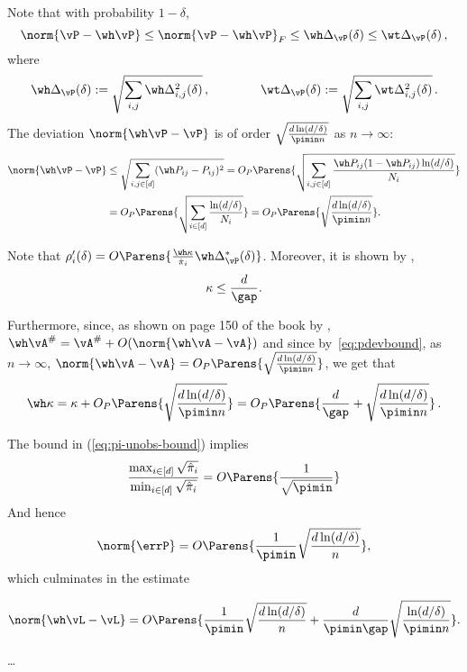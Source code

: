 Note that with probability $1-\delta$, 
\[
\norm{\vP - \wh\vP} \le \norm{\vP-\wh\vP}_F \le \wh\Delta_{\vP}(\delta) \le \wt\Delta_{\vP}(\delta)\,,
\]
where
\[
\wh\Delta_{\vP}(\delta) := \sqrt{\sum_{i,j} \wh\Delta_{i,j}^2(\delta)}\,, \qquad \qquad 
\wt\Delta_{\vP}(\delta) := \sqrt{\sum_{i,j} \wt\Delta_{i,j}^2(\delta)}\,.
\]
The deviation $\norm{\wh\vP - \vP}$ is of order $\sqrt{\frac{d \ln(d/\delta)}{\pimin n}}$ as $n\to \infty$:
\begin{align}
  \norm{\wh\vP - \vP} &\le
  \sqrt{\sum_{i,j\in[d]} (\wh P_{ij}-P_{ij})^2} 
  =
  O_P\Parens{
\sqrt{\sum_{i,j\in[d]} \frac{ \wh P_{ij}(1-\wh P_{ij})\ln(d/\delta)}{N_i}}
  } \nonumber\\
  &=
  O_P\Parens{
\sqrt{\sum_{i\in[d]} \frac{\ln(d/\delta)}{N_i}}
  } 
=O_P\Parens{\sqrt{\frac{d\ln(d/\delta)}{\pimin n}}}.  \label{eq:pdevbound}
\end{align}  


Note that
$  \rho_i'(\delta) = O\Parens{\frac{\wh\kappa}{\hat\pi_i}  \wh\Delta_{\vP}^*(\delta)}$.
Moreover, it is shown  by \citet{cho2001comparison},
\[
  \kappa \leq \frac{d}{\gap} .
  \]

  Furthermore, since, as shown  on page 150 of the book by \citet{stewart1990matrix}, 
$
  \wh\vA^\# = \vA^\# + O(\norm{\wh \vA-\vA}) $
and since  by~\eqref{eq:pdevbound}, as $n\to\infty$,
$\norm{\wh \vA-\vA} =O_P\Parens{\sqrt{\frac{d\ln(d/\delta)}{\pimin n}}}$,
we get that 
\[ \wh\kappa = \kappa + O_P\Parens{\sqrt{\frac{d\ln(d/\delta)}{\pimin n}}}
  = O_P\Parens{ \frac{d}{\gap} + \sqrt{\frac{d\ln(d/\delta)}{\pimin n}}}\,.
\]


  The bound in (\ref{eq:pi-unobs-bound}) implies
  $$
    \frac{\max_{i \in [d]} \sqrt{\hat\pi_i}}
  {\min_{i \in [d]} \sqrt{\hat\pi_i}}
= O\Parens{\frac1{\sqrt\pimin}}$$
And hence
$$
\norm{\errP}=O\Parens{
  \frac1{\pimin}
\sqrt{\frac{d\ln(d/\delta)}{ n}}
  },
$$
    which culminates in the estimate

    $$    \norm{\wh\vL - \vL}=O\Parens{
      \frac1{\pimin}\sqrt{\frac{d\ln(d/\delta)}{ n}}
      +
      \frac{d}{\pimin\gap} \sqrt{\frac{\ln(d/\delta)}{\pimin n}}
    }.$$

  \ldots
